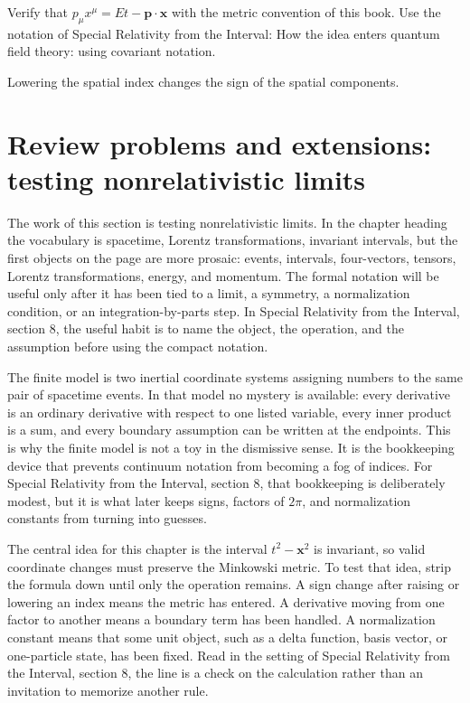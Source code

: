 \begin{exercise}
Verify that \(p_\mu x^\mu=Et-\bm p\cdot\bm x\) with the metric convention of this book.  Use the notation of Special Relativity from the Interval: How the idea enters quantum field theory: using covariant notation.
\begin{answer}
Lowering the spatial index changes the sign of the spatial components.
\end{answer}
\end{exercise}



\section{Review problems and extensions: testing nonrelativistic limits}

The work of this section is testing nonrelativistic limits.  In the chapter heading the vocabulary is spacetime, Lorentz transformations, invariant intervals, but the first objects on the page are more prosaic: events, intervals, four-vectors, tensors, Lorentz transformations, energy, and momentum.  The formal notation will be useful only after it has been tied to a limit, a symmetry, a normalization condition, or an integration-by-parts step.  In Special Relativity from the Interval, section 8, the useful habit is to name the object, the operation, and the assumption before using the compact notation.

The finite model is two inertial coordinate systems assigning numbers to the same pair of spacetime events.  In that model no mystery is available: every derivative is an ordinary derivative with respect to one listed variable, every inner product is a sum, and every boundary assumption can be written at the endpoints.  This is why the finite model is not a toy in the dismissive sense.  It is the bookkeeping device that prevents continuum notation from becoming a fog of indices.  For Special Relativity from the Interval, section 8, that bookkeeping is deliberately modest, but it is what later keeps signs, factors of \(2\pi\), and normalization constants from turning into guesses.

The central idea for this chapter is the interval \(t^2-\bm x^2\) is invariant, so valid coordinate changes must preserve the Minkowski metric.  To test that idea, strip the formula down until only the operation remains.  A sign change after raising or lowering an index means the metric has entered.  A derivative moving from one factor to another means a boundary term has been handled.  A normalization constant means that some unit object, such as a delta function, basis vector, or one-particle state, has been fixed.  Read in the setting of Special Relativity from the Interval, section 8, the line is a check on the calculation rather than an invitation to memorize another rule.

